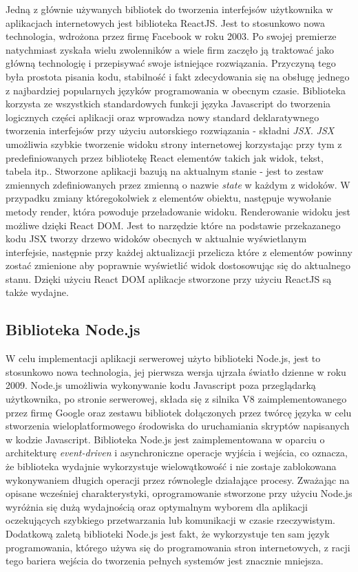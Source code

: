 Jedną z głównie używanych bibliotek do tworzenia interfejsów użytkownika w aplikacjach internetowych jest biblioteka ReactJS. Jest to stosunkowo nowa technologia, wdrożona przez firmę Facebook w roku 2003. Po swojej premierze natychmiast zyskała wielu zwolenników a wiele firm zaczęło ją traktować jako główną technologię i przepisywać swoje istniejące rozwiązania. Przyczyną tego była prostota pisania kodu, stabilność i fakt zdecydowania się na obsługę jednego z najbardziej popularnych języków programowania w obecnym czasie. Biblioteka korzysta ze wszystkich standardowych funkcji języka Javascript do tworzenia logicznych części aplikacji oraz wprowadza nowy standard deklaratywnego tworzenia interfejsów przy użyciu autorskiego rozwiązania - składni \textit{JSX}. \textit{JSX} umożliwia szybkie tworzenie widoku strony internetowej korzystając przy tym z predefiniowanych przez bibliotekę React elementów takich jak widok, tekst, tabela itp.. Stworzone aplikacji bazują na aktualnym stanie - jest to zestaw zmiennych zdefiniowanych przez zmienną o nazwie \textit{state} w każdym z widoków. W przypadku zmiany któregokolwiek z elementów obiektu, następuje wywołanie metody render, która powoduje przeładowanie widoku. Renderowanie widoku jest możliwe dzięki React DOM. Jest to narzędzie które na podstawie przekazanego kodu JSX tworzy drzewo widoków obecnych w aktualnie wyświetlanym interfejsie, następnie przy każdej aktualizacji przelicza które z elementów powinny zostać zmienione aby poprawnie wyświetlić widok dostosowując się do aktualnego stanu. Dzięki użyciu React DOM aplikacje stworzone przy użyciu ReactJS są także wydajne.

\subsection{Biblioteka Node.js}

W celu implementacji aplikacji serwerowej użyto biblioteki Node.js, jest to stosunkowo nowa technologia, jej pierwsza wersja ujrzała światło dzienne w roku 2009. Node.js umożliwia wykonywanie kodu Javascript poza przeglądarką użytkownika, po stronie serwerowej, składa się z silnika V8 zaimplementowanego przez firmę Google oraz zestawu bibliotek dołączonych przez twórcę języka w celu stworzenia wieloplatformowego środowiska do uruchamiania skryptów napisanych w kodzie Javascript. Biblioteka Node.js jest zaimplementowana w oparciu o architekturę \textit{event-driven} i asynchroniczne operacje wyjścia i wejścia, co oznacza, że biblioteka wydajnie wykorzystuje wielowątkowość i nie zostaje zablokowana wykonywaniem długich operacji przez równolegle działające procesy. Zważając na opisane wcześniej charakterystyki, oprogramowanie stworzone przy użyciu Node.js wyróżnia się dużą wydajnością oraz optymalnym wyborem dla aplikacji oczekujących szybkiego przetwarzania lub komunikacji w czasie rzeczywistym. Dodatkową zaletą biblioteki Node.js jest fakt, że wykorzystuje ten sam język programowania, którego używa się do programowania stron internetowych, z racji tego bariera wejścia do tworzenia pełnych systemów jest znacznie mniejsza.

